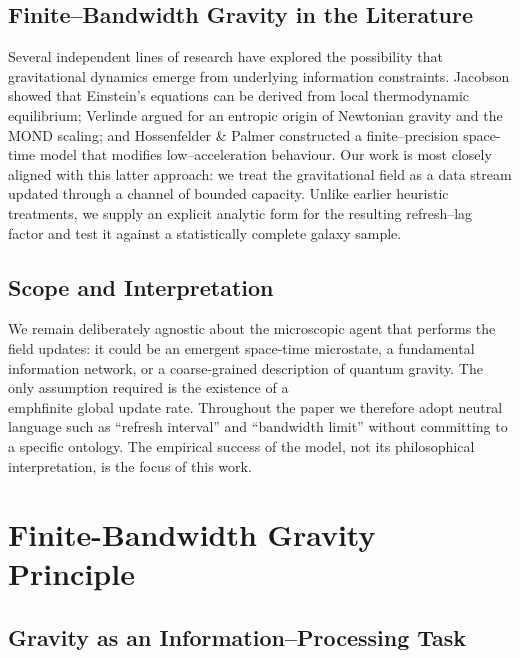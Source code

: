 \documentclass[twocolumn,prd,amsmath,amssymb,aps,superscriptaddress,nofootinbib]{revtex4-2}
\begin{document}
\subsection{Finite--Bandwidth Gravity in the Literature}

Several independent lines of research have explored the possibility that
gravitational dynamics emerge from underlying information constraints.
Jacobson showed that Einstein's equations can be derived from local
thermodynamic equilibrium\cite{Jacobson1995}; Verlinde argued for an
entropic origin of Newtonian gravity and the MOND scaling\cite{Verlinde2011};
and Hossenfelder \& Palmer constructed a finite--precision space-time
model that modifies low--acceleration behaviour\cite{Hossenfelder2017, Pikovski2020, Carroll2021}.
Our work is most closely aligned with this latter approach: we treat the
gravitational field as a data stream updated through a channel of
bounded capacity.  Unlike earlier heuristic treatments, we supply an
explicit analytic form for the resulting refresh--lag factor and test it
against a statistically complete galaxy sample.
\cite{Lelli2016, McGaugh2016b, Li2018}

\subsection{Scope and Interpretation}

We remain deliberately agnostic about the microscopic agent that
performs the field updates: it could be an emergent space-time
microstate, a fundamental information network, or a coarse‐grained
description of quantum gravity.  The only assumption required is the
existence of a \\emph{finite global update rate}.  Throughout the paper we
therefore adopt neutral language such as ``refresh interval'' and
``bandwidth limit'' without committing to a specific ontology.  The
empirical success of the model, not its philosophical interpretation, is
the focus of this work.

\section{Finite-Bandwidth Gravity Principle}
\label{sec:bandwidth}

\subsection{Gravity as an Information--Processing Task}
\end{document}
